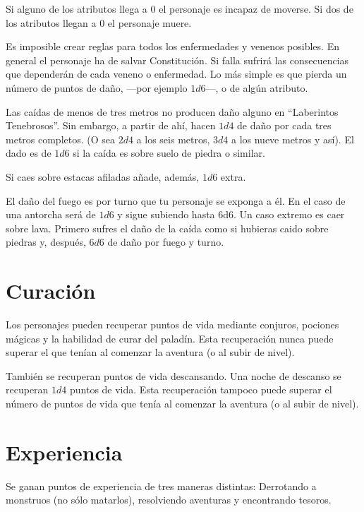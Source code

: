 \begin{multicols}{2}
Si alguno de los atributos llega a 0 el personaje es incapaz de moverse. Si dos
de los atributos llegan a 0 el personaje muere.


Es imposible crear reglas para todos los enfermedades y venenos posibles. En
general el personaje ha de salvar Constitución. Si falla sufrirá las consecuencias
que dependerán de cada veneno o enfermedad. Lo más simple es que pierda un número
de puntos de daño, ---por ejemplo $1d6$---, o de algún atributo.


Las caídas de menos de tres metros no producen daño alguno en
\enquote{Laberintos Tenebrosos}. Sin embargo, a partir de ahí, hacen $1d4$ de daño
por cada tres metros completos. (O sea $2d4$ a los seis metros, $3d4$ a los nueve metros y
así). El dado es de $1d6$ si la caída es sobre suelo de piedra o similar.

Si caes sobre estacas afiladas añade, además, $1d6$ extra.


El daño del fuego es por turno que tu personaje se exponga a él. En el caso de
una antorcha será de $1d6$ y sigue subiendo hasta 6d6. Un caso extremo es caer
sobre lava. Primero sufres el daño de la caída como si hubieras caido sobre
piedras y, después, $6d6$ de daño por fuego y turno.

\section{Curación}

Los personajes pueden recuperar puntos de vida mediante conjuros, pociones
mágicas y la habilidad de curar del paladín. Esta recuperación nunca puede superar el que tenían al
comenzar la aventura (o al subir de nivel).

También se recuperan puntos de vida descansando. Una noche de descanso se recuperan $1d4$ puntos
de vida. Esta recuperación tampoco puede superar el número de puntos de vida que tenía al
comenzar la aventura (o al subir de nivel).

\section{Experiencia}

Se ganan puntos de experiencia de tres maneras distintas: Derrotando a monstruos
(no sólo matarlos), resolviendo aventuras y encontrando tesoros.


\end{multicols}

